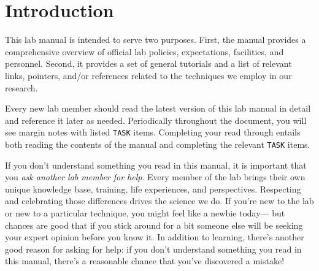 \documentclass{tufte-book} %
\begin{document}


\cleardoublepage
\chapter{Introduction}\label{ch:intro} %
This lab manual is intended to serve two purposes.  First, the manual
provides a comprehensive overview of official lab policies,
expectations, facilities, and personnel.  Second, it provides a set of
general tutorials and a list of relevant links, pointers, and/or
references related to the techniques we employ in our research.

   Every new lab member
should read the latest version of this lab manual in detail and
reference it later as needed.  Periodically throughout the document,
you will see margin notes with listed \texttt{TASK} items.  Completing
your read through entails both reading the contents of the manual and
completing the relevant \texttt{TASK} items.

If you don't understand something you
read in this manual, it is important that you \textit{ask another lab
  member for help}.  Every member of the lab brings their own unique
knowledge base, training, life experiences, and perspectives.
Respecting and celebrating those differences drives the science we do.
If you're new to the lab or new to a particular technique, you might
feel like a newbie today--- but chances are good that if you stick
around for a bit someone else will be seeking your expert opinion
before you know it.  In addition to learning, there's another good
reason for asking for help: if you don't understand something you read
in this manual, there's a reasonable chance that you've discovered a
mistake!
\end{document}
